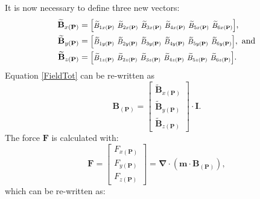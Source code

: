 It is now necessary to define three new vectors:
%
\begin{align}
\mathbf{\widetilde{B}}_{x(\mathbf{P})}&= \scalebox{.85}{$\setlength\arraycolsep{2pt} \begin{bmatrix}
\widetilde{B}_{1x(\mathbf{P})} & \widetilde{B}_{2x(\mathbf{P})} & \widetilde{B}_{3x(\mathbf{P})} & \widetilde{B}_{4x(\mathbf{P})} & \widetilde{B}_{5x(\mathbf{P})} & \widetilde{B}_{6x(\mathbf{P})}
\end{bmatrix}$},
\label{Gx} \\
%
\mathbf{\widetilde{B}}_{y(\mathbf{P})}&= \scalebox{.85}{$\setlength\arraycolsep{2pt}
\begin{bmatrix}
\widetilde{B}_{1y(\mathbf{P})} & \widetilde{B}_{2y(\mathbf{P})} & \widetilde{B}_{3y(\mathbf{P})} & \widetilde{B}_{4y(\mathbf{P})} & \widetilde{B}_{5y(\mathbf{P})} & \widetilde{B}_{6y(\mathbf{P})}
\end{bmatrix}$}, \textrm{ and}
\label{Gy} \\
%
\mathbf{\widetilde{B}}_{z(\mathbf{P})}&= \scalebox{.85}{$\setlength\arraycolsep{2pt} \begin{bmatrix}
\widetilde{B}_{1z(\mathbf{P})} & \widetilde{B}_{2z(\mathbf{P})} & \widetilde{B}_{3z(\mathbf{P})} & \widetilde{B}_{4z(\mathbf{P})} & \widetilde{B}_{5z(\mathbf{P})} & \widetilde{B}_{6z(\mathbf{P})}
\end{bmatrix}$}.
\label{Gz}
\end{align}
%
Equation \ref{FieldTot} can be re-written as
\begin{equation}
\mathbf{B}_{(\mathbf{P})}=\begin{bmatrix}
\mathbf{\widetilde{B}}_{x(\mathbf{P})}
\\
\mathbf{\widetilde{B}}_{y(\mathbf{P})}
\\ 
\mathbf{\widetilde{B}}_{z(\mathbf{P})}
\end{bmatrix}\cdot\mathbf{I}.
\end{equation}
%
The force $\mathbf{F}$ is calculated with:
%
\begin{equation}
\mathbf{F}=\begin{bmatrix}
F_{x(\mathbf{P})}
\\ 
F_{y(\mathbf{P})}
\\ 
F_{z(\mathbf{P})}
\end{bmatrix}
=\mathbf{\nabla}\cdot\left ( \mathbf{m}\cdot\mathbf{B}_{(\mathbf{P})} \right ),
\label{Force}
\end{equation}
%
which can be re-written as:
%
